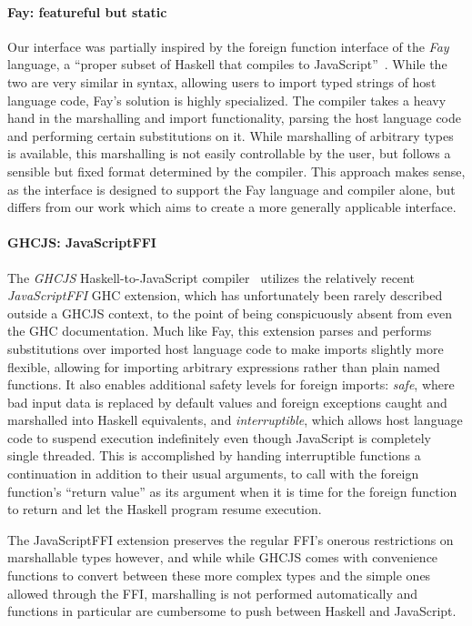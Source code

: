 \documentclass[preprint]{sigplanconf}
\begin{document}
\paragraph{Fay: featureful but static}
Our interface was partially inspired by the foreign function interface of the
\emph{Fay} language,
a ``proper subset of Haskell that compiles to JavaScript''\ \cite{fay}.
While the two are very similar in syntax, allowing users to import typed
strings of host language code, Fay's solution is highly specialized.
The compiler takes a heavy hand in the marshalling and import functionality,
parsing the host language code and performing certain substitutions on it.
While marshalling of arbitrary types is available, this marshalling is not
easily controllable by the user, but follows a sensible but fixed format
determined by the compiler.
This approach makes sense, as the interface is designed to support the Fay
language and compiler alone, but differs from our work which aims to create
a more generally applicable interface.

\paragraph{GHCJS: JavaScriptFFI}
The \emph{GHCJS} Haskell-to-JavaScript compiler\ \cite{ghcjs} utilizes the
relatively recent \emph{JavaScriptFFI} GHC extension,
which has unfortunately been rarely described outside a GHCJS context, to the
point of being conspicuously absent from even the GHC documentation.
Much like Fay, this extension parses and
performs substitutions over imported host language code to make imports
slightly more flexible, allowing for importing arbitrary expressions rather
than plain named functions.
It also enables additional safety levels for foreign
imports: \emph{safe}, where bad input data is replaced by default values and
foreign exceptions caught and marshalled into Haskell equivalents,
and \emph{interruptible}, which allows host language code to suspend execution
indefinitely even though JavaScript is completely single threaded.
This is accomplished by handing interruptible functions a continuation in
addition to their usual arguments, to call with the foreign function's
``return value'' as its argument when it is time for the foreign function
to return and let the Haskell program resume execution.

The JavaScriptFFI extension preserves the regular FFI's onerous restrictions
on marshallable types however, and while while GHCJS comes with convenience
functions to convert between these more complex types and the simple ones
allowed through the FFI, marshalling is not performed automatically and
functions in particular are cumbersome to push between Haskell and JavaScript.
\end{document}
